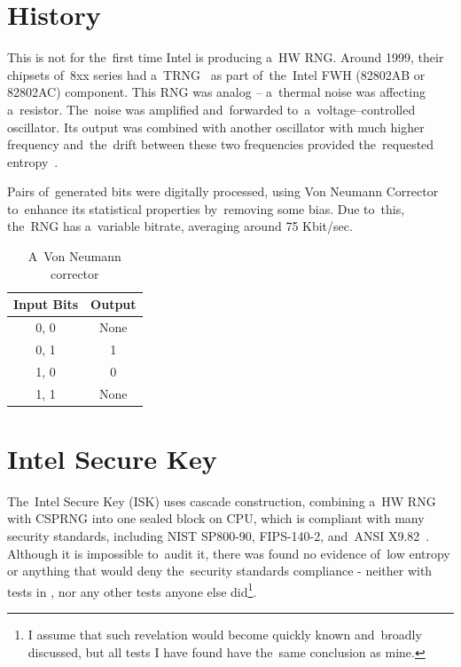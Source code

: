 \section{History}\label{sec:intel-history}
\par{
This is not for the~first time Intel is producing a~HW RNG. Around 1999, 
their chipsets of~8xx series had a~TRNG~\cite[chapter 1.3.5]{Intel810Manual}\cite{RNGTools} 
as part of~the~Intel FWH (82802AB or 82802AC) component.
This RNG was analog -- a~thermal noise was affecting a~resistor. 
The~noise was amplified and~forwarded to~a~voltage--controlled oscillator. 
Its output was combined with another oscillator with much higher frequency 
and~the~drift between these two frequencies provided the~requested entropy~\cite{IntelRNGAnalysis}.
}
\par{
Pairs of~generated bits were digitally processed, using Von Neumann Corrector to~enhance its statistical properties by~removing some bias. Due to~this, the~RNG has a~variable bitrate, averaging around 75 Kbit/sec.
}
\begin{table}[h!]
  \begin{center}
    \begin{tabular}{|c|c|}
      \hline
      Input Bits &  Output\\
      \hline  
      0, 0 & None\\
      0, 1 & 1\\
      1, 0 & 0\\
      1, 1 & None\\
      \hline
    \end{tabular}    \caption{A~Von Neumann corrector}
    \label{fig:VonNeumannCorrector}
  \end{center}
\end{table}

\newpage

\section{Intel Secure Key}\label{sec:intel-secure-key}
\par{
The~Intel Secure Key (ISK) uses cascade construction, combining a~HW RNG
 with CSPRNG into one sealed block on CPU, which is compliant with many 
 security standards, including NIST SP800-90, FIPS-140-2, and~ANSI 
X9.82~\cite{IntelDRNGGuide}. Although it is impossible to~audit it, there was found 
 no evidence of~low entropy or anything that would deny the~security standards 
 compliance - neither with tests in , nor any other 
 tests anyone else did\footnote{I assume that such revelation would become 
 quickly known and~broadly discussed, but all tests I have found have 
 the~same conclusion as mine.}.
 }

